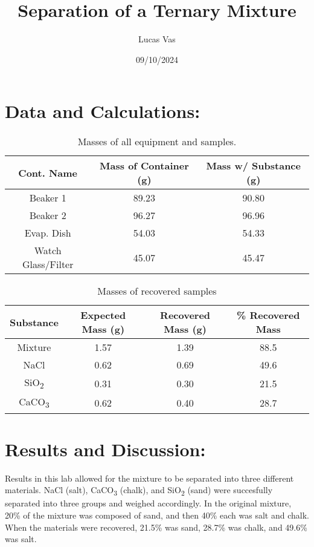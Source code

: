 \documentclass{article}
\begin{document}
\author{Lucas Vas}
\title{Separation of a Ternary Mixture}
\date{09/10/2024}

\maketitle

  \section*{Data and Calculations:}
  \begin{table}[h!]
    \centering
    \begin{tabular}{|| c c c ||}
      \hline
      Cont. Name & Mass of Container (g) & Mass w/ Substance (g) \\
      \hline\hline
      Beaker 1 & 89.23 & 90.80 \\
      \hline
      Beaker 2 & 96.27 & 96.96 \\
      \hline
      Evap. Dish & 54.03 & 54.33 \\
      \hline
      Watch Glass/Filter & 45.07 & 45.47 \\
      \hline
    \end{tabular}
    \label{table:1}
    \caption{Masses of all equipment and samples.}
  \end{table}

  \begin{table}[h!]
    \centering
    \begin{tabular}{|| c c c c ||}
      \hline
      Substance & Expected Mass (g) & Recovered Mass (g) & \% Recovered Mass \\
      \hline\hline
      Mixture & 1.57 & 1.39 & 88.5 \\
      \hline
      NaCl & 0.62 & 0.69 & 49.6 \\
      \hline
      SiO\textsubscript{2} & 0.31 & 0.30 & 21.5 \\
      \hline
      CaCO\textsubscript{3} & 0.62 & 0.40 & 28.7 \\
      \hline
    \end{tabular}
    \label{table:2}
    \caption{Masses of recovered samples}
  \end{table}

  \section*{Results and Discussion:}

  Results in this lab allowed for the mixture to be separated into three different materials.
  NaCl (salt), CaCO\textsubscript{3} (chalk), and SiO\textsubscript{2} (sand) were succesfully separated into three groups and
  weighed accordingly. In the original mixture, 20\% of the mixture was composed of sand, and then 40\%
  each was salt and chalk. When the materials were recovered, 21.5\% was sand, 28.7\% was chalk, and
  49.6\% was salt.
\end{document}
